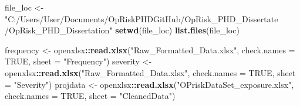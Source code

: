 \documentclass[]{article}
\newenvironment{Shaded}{\begin{snugshade}}{\end{snugshade}}
\newcommand{\KeywordTok}[1]{\textcolor[rgb]{0.13,0.29,0.53}{\textbf{#1}}}
\newcommand{\DataTypeTok}[1]{\textcolor[rgb]{0.13,0.29,0.53}{#1}}
\newcommand{\StringTok}[1]{\textcolor[rgb]{0.31,0.60,0.02}{#1}}
\newcommand{\OtherTok}[1]{\textcolor[rgb]{0.56,0.35,0.01}{#1}}
\newcommand{\OperatorTok}[1]{\textcolor[rgb]{0.81,0.36,0.00}{\textbf{#1}}}
\newcommand{\NormalTok}[1]{#1}
\begin{document}
\begin{Shaded}
\begin{Highlighting}[]
\NormalTok{file_loc <-}\StringTok{ "C:/Users/User/Documents/OpRiskPHDGitHub/OpRisk_PHD_Dissertate}
\StringTok{/OpRisk_PHD_Dissertation"}
\KeywordTok{setwd}\NormalTok{(file_loc)}
\KeywordTok{list.files}\NormalTok{(file_loc)}

\NormalTok{frequency <-}\StringTok{ }\NormalTok{openxlsx}\OperatorTok{::}\KeywordTok{read.xlsx}\NormalTok{(}\StringTok{"Raw_Formatted_Data.xlsx"}\NormalTok{, }
                                 \DataTypeTok{check.names =} \OtherTok{TRUE}\NormalTok{, }\DataTypeTok{sheet =} \StringTok{"Frequency"}\NormalTok{)}
\NormalTok{severity <-}\StringTok{ }\NormalTok{openxlsx}\OperatorTok{::}\KeywordTok{read.xlsx}\NormalTok{(}\StringTok{"Raw_Formatted_Data.xlsx"}\NormalTok{, }
                                \DataTypeTok{check.names =} \OtherTok{TRUE}\NormalTok{, }\DataTypeTok{sheet =} \StringTok{"Severity"}\NormalTok{)}
\NormalTok{projdata <-}\StringTok{ }\NormalTok{openxlsx}\OperatorTok{::}\KeywordTok{read.xlsx}\NormalTok{(}\StringTok{"OPriskDataSet_exposure.xlsx"}\NormalTok{, }
                                \DataTypeTok{check.names =} \OtherTok{TRUE}\NormalTok{, }\DataTypeTok{sheet =} \StringTok{"CleanedData"}\NormalTok{)}
\end{Highlighting}
\end{Shaded}

\normalsize

\small
\end{document}
